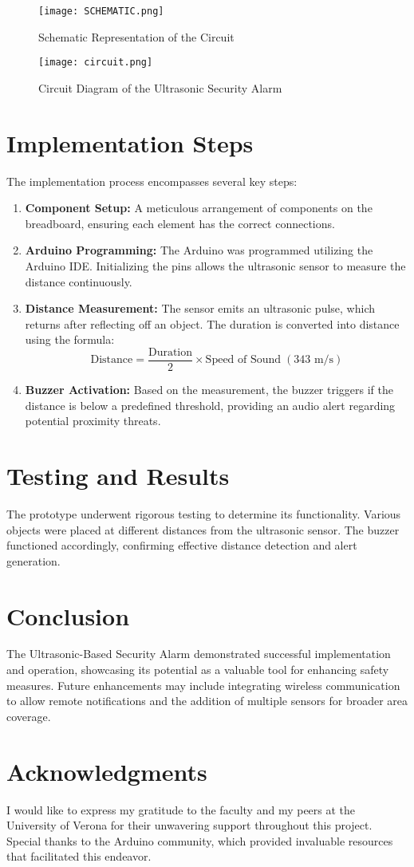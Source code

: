 \documentclass{article}
\begin{document}
\begin{figure}[h!]
    \centering
    \texttt{[image: SCHEMATIC.png]}
    \caption{Schematic Representation of the Circuit}
    \label{fig:schematic}
\end{figure}

\begin{figure}[h!]
    \centering
    \texttt{[image: circuit.png]}
    \caption{Circuit Diagram of the Ultrasonic Security Alarm}
    \label{fig:circuit_diagram}
\end{figure}

\section{Implementation Steps}
The implementation process encompasses several key steps:
\begin{enumerate}
    \item \textbf{Component Setup:} A meticulous arrangement of components on the breadboard, ensuring each element has the correct connections.
    \item \textbf{Arduino Programming:} The Arduino was programmed utilizing the Arduino IDE. Initializing the pins allows the ultrasonic sensor to measure the distance continuously.
    \item \textbf{Distance Measurement:} The sensor emits an ultrasonic pulse, which returns after reflecting off an object. The duration is converted into distance using the formula:
    \[
    \text{Distance} = \frac{\text{Duration}}{2} \times \text{Speed of Sound} \; (343 \text{ m/s})
    \]
    \item \textbf{Buzzer Activation:} Based on the measurement, the buzzer triggers if the distance is below a predefined threshold, providing an audio alert regarding potential proximity threats.
\end{enumerate}

\section{Testing and Results}
The prototype underwent rigorous testing to determine its functionality. Various objects were placed at different distances from the ultrasonic sensor. The buzzer functioned accordingly, confirming effective distance detection and alert generation.

\section{Conclusion}
The Ultrasonic-Based Security Alarm demonstrated successful implementation and operation, showcasing its potential as a valuable tool for enhancing safety measures. Future enhancements may include integrating wireless communication to allow remote notifications and the addition of multiple sensors for broader area coverage.

\section{Acknowledgments}
I would like to express my gratitude to the faculty and my peers at the University of Verona for their unwavering support throughout this project. Special thanks to the Arduino community, which provided invaluable resources that facilitated this endeavor.
\end{document}
